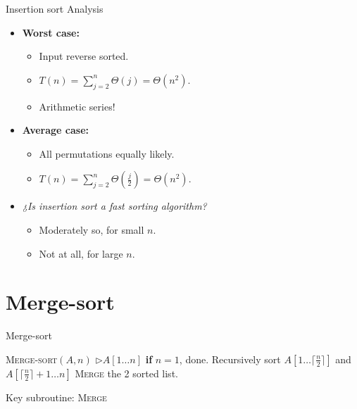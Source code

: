 \documentclass{beamer}
\begin{document}
\begin{frame}{Insertion sort Analysis}
    \begin{itemize}
        \item \textbf{Worst case:} 
        \begin{itemize}
            \item Input reverse sorted.
            \item $T(n) = \sum^{n}_{j = 2} \Theta(j) = \Theta(n^2)$.
            \item Arithmetic series!
        \end{itemize}
        \item \textbf{Average case:}
        \begin{itemize}
            \item All permutations equally likely.
            \item $T(n) = \sum^{n}_{j = 2} \Theta(\frac{j}{2}) = \Theta(n^2)$.
        \end{itemize}
    \end{itemize}
    \begin{itemize}
        \item \textit{¿Is insertion sort a fast sorting algorithm?}
        \begin{itemize}
            \item Moderately so, for small $n$.
            \item Not at all, for large $n$.
        \end{itemize}

    \end{itemize}

\end{frame}

\section{Merge-sort}

\begin{frame}{Merge-sort}
    \begin{algorithm}[H]
        \caption{Insertion Sort}
        \begin{algorithmic}[1]
            \STATE \textsc{Merge-sort}$(A, n)$ \hspace{5mm} $\rhd A[1 \ldots n]$ 
            \STATE \hspace{1em} \textbf{if} $n = 1$, done.
            \STATE \hspace{1em} Recursively sort $A[ 1 \ldots \lceil \frac{n}{2} \rceil ]$ and $A[ \lceil \frac{n}{2} \rceil + 1 \ldots n ]$
            \STATE \hspace{1em} \textsc{Merge} the 2 sorted list.
        \end{algorithmic}
    \end{algorithm}
    \vspace{5mm}
    \centering
    Key subroutine: \textsc{Merge}
\end{frame}
\end{document}
